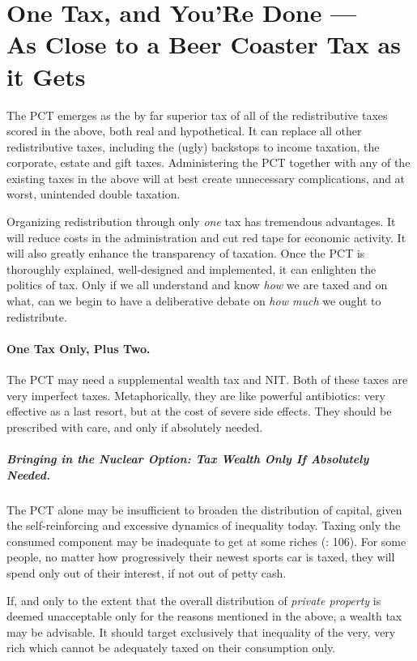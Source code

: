 

\section[One Tax Only]{One Tax, and You'Re Done ---\\As Close to a Beer Coaster Tax as it Gets}
\label{sec:OneTax} The PCT emerges as the by far superior tax of all of the redistributive taxes scored in the above, both real and hypothetical. It can replace all other redistributive taxes, including the (ugly) backstops to income taxation, the corporate, estate and gift taxes. Administering the PCT together with any of the existing taxes in the above will at best create unnecessary complications, and at worst, unintended double taxation.

Organizing redistribution through only \emph{one} tax has tremendous advantages. It will reduce costs in the administration and cut red tape for economic activity. It will also greatly enhance the transparency of taxation. Once the PCT is thoroughly explained, well-designed and implemented, it can enlighten the politics of tax. Only if we all understand and know \emph{how} we are taxed and on what, can we begin to have a deliberative debate on \emph{how much} we ought to redistribute.

\paragraph{One Tax Only, Plus Two.} The PCT may need a supplemental wealth tax and NIT. Both of these taxes are very imperfect taxes. Metaphorically, they are like powerful antibiotics: very effective as a last resort, but at the cost of severe side effects. They should be prescribed with care, and only if absolutely needed.

\subparagraph{Bringing in the Nuclear Option: Tax Wealth Only If Absolutely Needed.} The PCT alone may be insufficient to broaden the distribution of capital, given the self-reinforcing and excessive dynamics of inequality today. Taxing only the consumed component may be inadequate to get at some riches (\citealt{Shaviro2004}: 106). For some people, no matter how progressively their newest sports car is taxed, they will spend only out of their interest, if not out of petty cash.

If, and only to the extent that the overall distribution of \emph{private property} is deemed unacceptable only for the reasons mentioned in the above, a wealth tax may be advisable. It should target exclusively that inequality of the very, very rich which cannot be adequately taxed on their consumption only.

